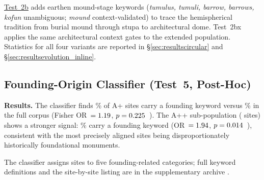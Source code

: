 \hyperref[sec:resultsevolution_inline]{Test~2b} adds earthen mound-stage
keywords (\textit{tumulus, tumuli, barrow, barrows, kofun} unambiguous;
\textit{mound} context-validated) to trace the hemispherical tradition
from burial mound through stupa to architectural dome. Test~2bx applies
the same architectural context gates to the extended population.
Statistics for all four variants are reported in
\hyperref[sec:resultscircular]{§\ref*{sec:resultscircular}} and
\hyperref[sec:resultsevolution_inline]{§\ref*{sec:resultsevolution_inline}}.

\subsection{Founding-Origin Classifier (Test~5, Post-Hoc)}
\label{sec:kwdaudit_founding}

\textbf{Results.} The classifier finds \foundKwApRate\% of A+ sites
carry a founding keyword versus \foundKwBaseRate\% in the full corpus
(Fisher OR~$= 1.19$, $p = 0.225$~\pFoundKwFisherSig{}).
The A++ sub-population (\NfoundKwTotalApp{} sites) shows a stronger
signal: \foundKwAppRate\% carry a founding keyword
(OR~$= 1.94$, $p = 0.014$~\pFoundKwAppFisherSig{}),
consistent with the most precisely aligned sites being disproportionately
historically foundational monuments.

The classifier assigns sites to five founding-related categories; full
keyword definitions and the site-by-site listing are in the supplementary
archive \citep{tenenbaum2026audit}.




